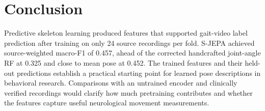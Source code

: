 \documentclass[10pt,twocolumn,letterpaper]{article}
\begin{document}
\section{Conclusion}
Predictive skeleton learning produced features that supported gait-video label prediction after training on only 24 source recordings per fold. S-JEPA achieved source-weighted macro-F1 of 0.457, ahead of the corrected handcrafted joint-angle RF at 0.325 and close to mean pose at 0.452. The trained features and their held-out predictions establish a practical starting point for learned pose descriptions in behavioral research. Comparisons with an untrained encoder and clinically verified recordings would clarify how much pretraining contributes and whether the features capture useful neurological movement measurements.

{\small


}
\end{document}
